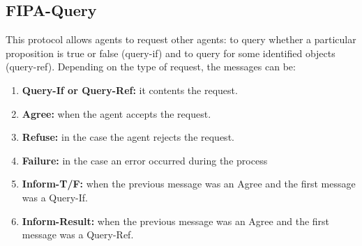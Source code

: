 


\subsection{FIPA-Query}
This protocol allows agents to request other agents: to query whether a particular proposition is true or false (query-if) and to query for some identified objects (query-ref). Depending on the type of request, the messages can be:

\begin{enumerate}

\item  \textbf{Query-If or Query-Ref:} it contents the request.
\item  \textbf{Agree:} when the agent accepts the request.
\item  \textbf{Refuse:} in the case the agent rejects the request.
\item  \textbf{Failure:} in the case an error occurred during the process
\item  \textbf{Inform-T/F:} when the previous message was an Agree and the first message was a Query-If.
\item  \textbf{Inform-Result:} when the previous message was an Agree and the first message was a Query-Ref.
\end{enumerate}


